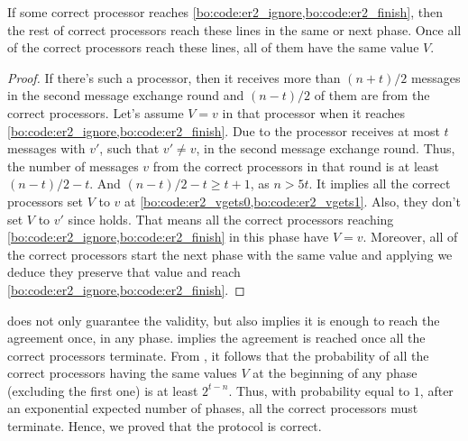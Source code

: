 \begin{lemma}\label{bo:lem:agreement}
If some correct processor reaches \cref{bo:code:er2_ignore,bo:code:er2_finish}, then the rest of correct processors reach these lines in the same or next phase. Once all of the correct processors reach these lines, all of them have the same value $V$.
\end{lemma}
\begin{proof}
If there's such a processor, then it receives more than $(n+t)/2$ messages in the second message exchange round and $(n-t)/2$ of them are from the correct processors. Let's assume $V=v$ in that processor when it reaches \cref{bo:code:er2_ignore,bo:code:er2_finish}. Due to  the processor receives at most $t$ messages with $v'$, such that $v'\neq v$, in the second message exchange round. Thus, the number of messages $v$ from the correct processors in that round is at least $(n-t)/2-t$. And $(n-t)/2-t\geq t+1$, as $n>5t$. It implies all the correct processors set $V$ to $v$ at \cref{bo:code:er2_vgets0,bo:code:er2_vgets1}. Also, they don't set $V$ to $v'$ since  holds. That means all the correct processors reaching \cref{bo:code:er2_ignore,bo:code:er2_finish} in this phase have $V=v$. Moreover, all of the correct processors start the next phase with the same value and applying  we deduce they preserve that value and reach \cref{bo:code:er2_ignore,bo:code:er2_finish}.
\end{proof}

 does not only guarantee the validity, but also implies it is enough to reach the agreement once, in any phase.  implies the agreement is reached once all the correct processors terminate. From , it follows that the probability of all the correct processors having the same values $V$ at the beginning of any phase (excluding the first one) is at least $2^{t-n}$. Thus, with probability equal to $1$, after an exponential expected number of phases, all the correct processors must terminate. Hence, we proved that the protocol is correct.

